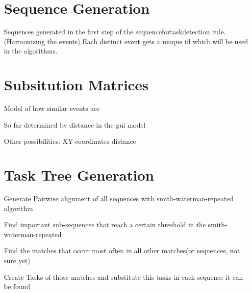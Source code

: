 \section{Sequence Generation}
Sequences generated in the first step of the sequencefortaskdetection rule. (Harmonizing the events)
Each distinct event gets a unique id which will be used in the algorithms. 

\section{Subsitution Matrices}

Model of how similar events are

So far determined by distance in the gui model

Other possibilities: XY-coordinates distance


\section{Task Tree Generation}
Generate Pairwise alignment of all sequences with smith-waterman-repeated algorithm

Find important sub-sequences that reach a certain threshold in the smith-waterman-repeated

Find the matches that occur most often in all other matches(or sequences, not sure yet)

Create Tasks of those matches and substitute this tasks in each sequence it can be found

